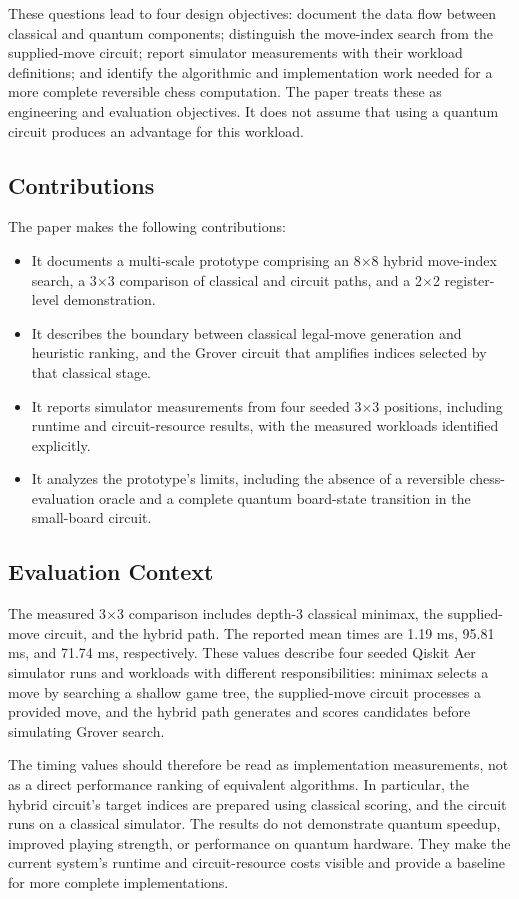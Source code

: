 \documentclass[conference]{IEEEtran}
\begin{document}
These questions lead to four design objectives: document the data flow between classical and quantum components; distinguish the move-index search from the supplied-move circuit; report simulator measurements with their workload definitions; and identify the algorithmic and implementation work needed for a more complete reversible chess computation. The paper treats these as engineering and evaluation objectives. It does not assume that using a quantum circuit produces an advantage for this workload.

\subsection{Contributions}
The paper makes the following contributions:
\begin{itemize}
  \item It documents a multi-scale prototype comprising an 8$\times$8 hybrid move-index search, a 3$\times$3 comparison of classical and circuit paths, and a 2$\times$2 register-level demonstration.
  \item It describes the boundary between classical legal-move generation and heuristic ranking, and the Grover circuit that amplifies indices selected by that classical stage.
  \item It reports simulator measurements from four seeded 3$\times$3 positions, including runtime and circuit-resource results, with the measured workloads identified explicitly.
  \item It analyzes the prototype's limits, including the absence of a reversible chess-evaluation oracle and a complete quantum board-state transition in the small-board circuit.
\end{itemize}

\subsection{Evaluation Context}
The measured 3$\times$3 comparison includes depth-3 classical minimax, the supplied-move circuit, and the hybrid path. The reported mean times are 1.19 ms, 95.81 ms, and 71.74 ms, respectively. These values describe four seeded Qiskit Aer simulator runs \cite{aer2026} and workloads with different responsibilities: minimax selects a move by searching a shallow game tree, the supplied-move circuit processes a provided move, and the hybrid path generates and scores candidates before simulating Grover search.

The timing values should therefore be read as implementation measurements, not as a direct performance ranking of equivalent algorithms. In particular, the hybrid circuit's target indices are prepared using classical scoring, and the circuit runs on a classical simulator. The results do not demonstrate quantum speedup, improved playing strength, or performance on quantum hardware. They make the current system's runtime and circuit-resource costs visible and provide a baseline for more complete implementations.
\end{document}
